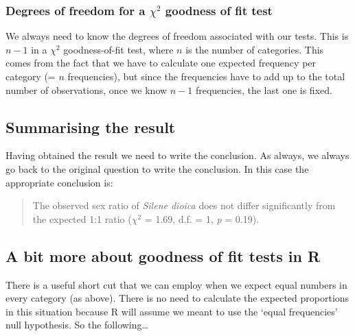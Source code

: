 \documentclass[
]{book}
\newenvironment{greybox}{
  \definecolor{shadecolor}{rgb}{0.95,0.95,0.95}  %
  \color{black}
  \begin{shaded}}
 {\end{shaded}}
\newenvironment{infobox}[1]
  {
  \begin{itemize}
  \renewcommand{\labelitemi}{
    \raisebox{-.7\height}[0pt][0pt]{
      {\setkeys{Gin}{width=3em,keepaspectratio}
        \texttt{[image: images/\#1]}}
    }
  }
  \setlength{\fboxsep}{1em}
  \begin{greybox}
  \item
  }
  {
  \end{greybox}
  \end{itemize}
  }
\begin{document}
\begin{infobox}{information}

\hypertarget{degrees-of-freedom-for-a-chi2-goodness-of-fit-test}{%
\subsubsection*{\texorpdfstring{Degrees of freedom for a \(\chi^{2}\) goodness of fit test}{Degrees of freedom for a \textbackslash chi\^{}\{2\} goodness of fit test}}\label{degrees-of-freedom-for-a-chi2-goodness-of-fit-test}}

We always need to know the degrees of freedom associated with our tests. This is \(n-1\) in a \(\chi^{2}\) goodness-of-fit test, where \(n\) is the number of categories. This comes from the fact that we have to calculate one expected frequency per category (= \(n\) frequencies), but since the frequencies have to add up to the total number of observations, once we know \(n-1\) frequencies, the last one is fixed.

\end{infobox}

\hypertarget{summarising-the-result-2}{%
\subsection{Summarising the result}\label{summarising-the-result-2}}

Having obtained the result we need to write the conclusion. As always, we always go back to the original question to write the conclusion. In this case the appropriate conclusion is:

\begin{quote}
The observed sex ratio of \emph{Silene dioica} does not differ significantly from the expected 1:1 ratio (\(\chi^{2}\) = 1.69, d.f. = 1, \emph{p} = 0.19).
\end{quote}

\hypertarget{a-bit-more-about-goodness-of-fit-tests-in-r}{%
\subsection{A bit more about goodness of fit tests in R}\label{a-bit-more-about-goodness-of-fit-tests-in-r}}

There is a useful short cut that we can employ when we expect equal numbers in every category (as above). There is no need to calculate the expected proportions in this situation because R will assume we meant to use the `equal frequencies' null hypothesis. So the following\ldots{}
\end{document}
